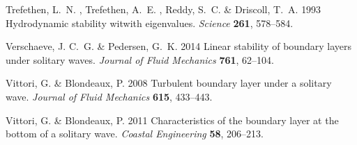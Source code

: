 \documentclass{jfm}
\begin{document}
\begin{thebibliography}{45}
{\sc Trefethen, L.~N. , Trefethen, A.~E. , Reddy, S.~C.  \& Driscoll, T.~A. }
  1993 Hydrodynamic stability witwith eigenvalues. {\em Science\/} {\bf 261},
  578--584.

{\sc Verschaeve, J. C.~G.  \& Pedersen, G.~K. } 2014 Linear stability of
  boundary layers under solitary waves. {\em Journal of Fluid Mechanics\/} {\bf
  761}, 62--104.

{\sc Vittori, G.  \& Blondeaux, P. } 2008 Turbulent boundary layer under a
  solitary wave. {\em Journal of Fluid Mechanics\/} {\bf 615}, 433--443.

{\sc Vittori, G.  \& Blondeaux, P. } 2011 Characteristics of the boundary layer
  at the bottom of a solitary wave. {\em Coastal Engineering\/} {\bf 58},
  206--213.

\end{thebibliography}
\end{document}
